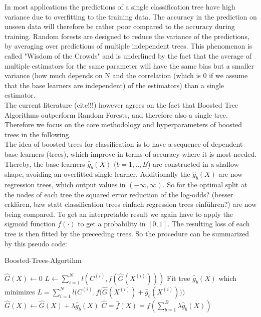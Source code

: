 \documentclass[12pt,titlepage]{article}
\begin{document}
In most applications the predictions of a single classification tree have high variance due to overfitting to the training data. The accuracy in the prediction on unseen data will therefore be rather poor compared to the accuracy during training. Random forests \cite{randomforest} are designed to reduce the variance of the predictions, by averaging over predictions of multiple independent trees. This phenomenon is called "Wisdom of the Crowds" and is underlined by the fact that the average of multiple estimators for the same parameter will have the same bias but a smaller variance (how much depends on N and the correlation (which is 0 if we assume that the base learners are independent) of the estimators) than a single estimator. \\
The current literature (cite!!!) however agrees on the fact that Boosted Tree Algorithms outperform Random Forests, and therefore also a single tree. Therefore we focus on the core methodology and hyperparameters of boosted trees in the following. \\
The idea of boosted trees for classification is to have a sequence of dependent base learners (trees), which improve in terms of accuracy where it is most needed. Thereby, the base learners $\hat{g}_{b}(X)$ ($b=1,..,B$) are constructed in a shallow shape, avoiding an overfitted single learner. Additionally the $\hat{g}_{b}(X)$ are now regression trees, which output values in $(-\infty, \infty)$. So for the optimal split at the nodes of each tree the squared error reduction of the log-odds? (besser erklären, bzw statt classification trees einfach regression trees einführen?) are now being compared. To get an interpretable result we again have to apply the sigmoid function $f(\cdot)$ to get a probability in $[0, 1]$. The resulting loss of each tree is then fitted by the preceeding trees. So the procedure can be summarized by this pseudo code: \\

\begin{algorithm}
\caption{Boosted-Trees-Algortihm}\label{alg:boostedtrees}
\begin{algorithmic}
    \State $\hat{G}(X) \gets 0$
    \State $L \gets \sum_{i=1}^{N} l(C^{(i)}, f(\hat{G}(X^{(i)})))$
        \State Fit tree $\hat{g}_{b}(X)$ which minimizes $L = \sum_{i=1}^{N} l\Big(C^{(i)}, f\big(\hat{G}(X^{(i)}) + \hat{g}_{b}(X^{(i)})\big)\Big)$
        \State $\hat{G}(X) \gets \hat{G}(X) + \lambda\hat{g}_{b}(X)$
    \EndFor
    \State $\hat{C} = \hat{f}(X) = f(\sum_{b=1}^{B}\lambda\hat{g}_{b}(X))$
\end{algorithmic}
\end{algorithm}
\end{document}
